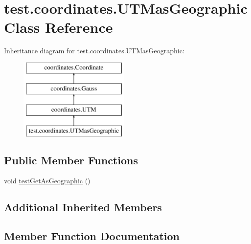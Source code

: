 \hypertarget{classtest_1_1coordinates_1_1_u_t_mas_geographic}{}\section{test.\+coordinates.\+U\+T\+Mas\+Geographic Class Reference}
\label{classtest_1_1coordinates_1_1_u_t_mas_geographic}
Inheritance diagram for test.\+coordinates.\+U\+T\+Mas\+Geographic\+:\begin{figure}[H]
\begin{center}
\leavevmode
\includegraphics[height=4.000000cm]{classtest_1_1coordinates_1_1_u_t_mas_geographic}
\end{center}
\end{figure}
\subsection*{Public Member Functions}
\begin{DoxyCompactItemize}
\item 
void \hyperlink{classtest_1_1coordinates_1_1_u_t_mas_geographic_a4afc80429fd47c4eec64e8f120c9717d}{test\+Get\+As\+Geographic} ()
\end{DoxyCompactItemize}
\subsection*{Additional Inherited Members}


\subsection{Member Function Documentation}
\mbox{\label{classtest_1_1coordinates_1_1_u_t_mas_geographic_a4afc80429fd47c4eec64e8f120c9717d}} 
